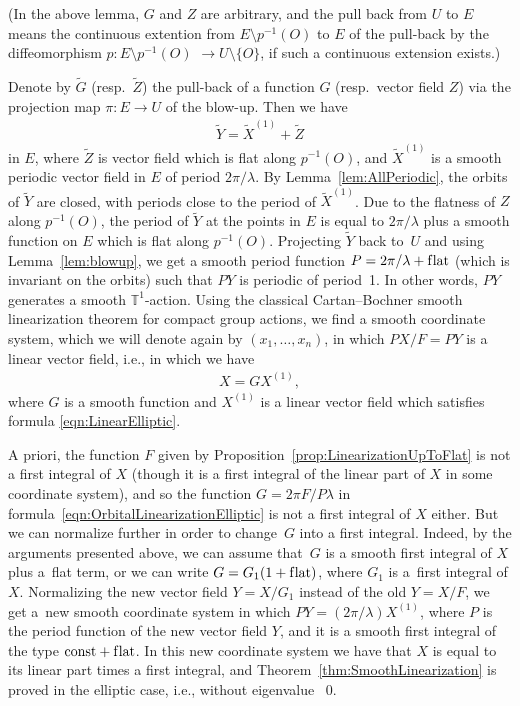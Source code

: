 \documentclass[pdftex]{sigma}
\numberwithin{equation}{section}
\newcommand{\bbT}{\mathbb T}
\begin{document}
(In the above lemma, $G$ and $Z$ are arbitrary, and the pull back from
$U$ to $E$ means the con\-ti\-nuous extention from $E \setminus p^{-1}(O)$
to $E$ of the pull-back by the dif\/feomorphism $p\colon E \setminus p^{-1}(O)$ $\to U \setminus \{O\}$, if such a continuous extension exists.)

Denote by $\tilde G$ (resp.~$\tilde Z$) the pull-back of a function $G$ (resp.\ vector f\/ield $Z$) via the projection
map $\pi\colon E \to U$ of the blow-up. Then we have
\begin{gather*}
\tilde Y = \tilde X^{(1)} + \tilde Z
\end{gather*}
in $E$, where $\tilde Z$ is vector f\/ield which is f\/lat along $p^{-1}(O)$, and $\tilde X^{(1)}$ is a smooth periodic vector f\/ield
in $E$ of period $2\pi/\lambda$. By Lemma~\ref{lem:AllPeriodic}, the orbits of $\tilde Y$ are closed, with periods close
to the period of $\tilde X^{(1)}$. Due to the f\/latness of $Z$ along $p^{-1}(O)$, the period of $\tilde Y$ at the points in $E$
is equal to $2\pi/\lambda$ plus a smooth function on $E$ which is f\/lat along $p^{-1}(O)$. Projecting $\tilde Y$ back to~$U$
and using Lemma~\ref{lem:blowup}, we get a smooth period function $P = 2\pi/\lambda + \text{f\/lat}$
(which is invariant on the orbits)
such that $PY$ is periodic of period~1.
In other words, $PY$ generates a smooth $\bbT^1$-action. Using the classical Cartan--Bochner
smooth linearization theorem
for compact group actions, we f\/ind a smooth coordinate system, which we will denote again by $(x_1,\dots,x_n)$,
in which $PX/F = PY$ is a linear vector f\/ield, i.e., in which we have
\begin{gather} \label{eqn:OrbitalLinearizationElliptic}
X = GX^{(1)},
\end{gather}
where $G$ is a smooth function and $X^{(1)}$ is a linear vector f\/ield which satisf\/ies formula \eqref{eqn:LinearElliptic}.

A priori, the function $F$ given by Proposition~\ref{prop:LinearizationUpToFlat} is not a f\/irst integral of $X$
(though it is a f\/irst integral of the linear part of $X$ in some coordinate system), and so the function
$G = 2\pi F/P \lambda$ in formula~\eqref{eqn:OrbitalLinearizationElliptic} is not a f\/irst integral of $X$ either.
But we can normalize further in order to change~$G$ into a f\/irst integral. Indeed, by the arguments presented above,
we can assume that~$G$ is a smooth f\/irst integral of $X$ plus a~f\/lat term, or we can write $G = G_1 (1+ \text{f\/lat})$, where
$G_1$ is a~f\/irst integral of $X$. Normalizing the new vector f\/ield $Y = X/G_1$ instead of the old $Y = X/F$, we get a~new smooth coordinate system in which $PY = (2\pi/\lambda) X^{(1)}$, where $P$ is the period function of the new vector f\/ield $Y$,
and it is a smooth f\/irst integral of the type $\text{const} + \text{f\/lat}$. In this new coordinate system we have that $X$ is equal to
its linear part times a f\/irst integral, and Theorem~\ref{thm:SmoothLinearization}
is proved in the elliptic case, i.e., without eigenvalue ~0.
\end{document}
